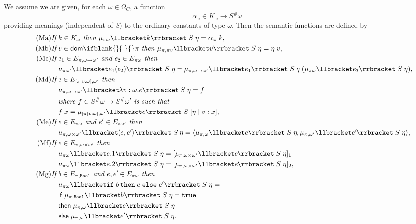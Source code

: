 \documentclass[sigplan,screen,nonacm,balance=false]{acmart}
\theoremstyle{plain}
\DeclarePairedDelimiter{\pair}{\langle}{\rangle}
\DeclarePairedDelimiter{\interp}{\llbracket}{\rrbracket}
\newcommand{\Bool}{\mathtt{Bool}}
\newcommand{\true}{\mathtt{true}}
\newcommand{\ifte}[3]{\mathtt{if} \; #1 \; \mathtt{then} \; #2 \; \mathtt{else} \; #3}
\newcommand{\dom}[1]{\mathsf{dom}\ifblank{#1}{\;}{#1}}
\newcommand{\ifm}{\mathsf{if}}
\newcommand{\thenm}{\mathsf{then}}
\newcommand{\elsem}{\mathsf{else}}
\begin{document}
We assume we are given, for each $\omega \in \Omega_{C}$, a function
%
\begin{equation*}
  \alpha_\omega \in K_\omega \to S^\# \omega
\end{equation*}
%
providing meanings (independent of $S$) to the ordinary constants of type $\omega$.
Then the semantic functions are defined by
%
\begin{align}
  \tag{Ma}
  \textit{If } & k \in K_\omega \textit{ then } \mu_{\pi \omega} \interp{k} \; S \; \eta = \alpha_\omega \; k, \\
  \tag{Mb}
  \textit{If } & v \in \dom{} \pi \textit{ then } \mu_{\pi, \pi v} \interp{v} \; S \; \eta = \eta \; v, \\
  \tag{Mc}
  \textit{If } & e_1 \in E_{\pi, \omega \to \omega'} \textit{ and } e_2 \in E_{\pi \omega} \textit{ then } \\
  \nonumber
  & \mu_{\pi \omega'} \interp{e_1(e_2)} \; S \; \eta = \mu_{\pi, \omega \to \omega'} \interp{e_1} \; S \; \eta \; (\mu_{\pi \omega} \interp{e_2} \; S \; \eta), \\
  \tag{Md}
  \textit{If } & e \in E_{[\pi \mid v : \omega], \omega'} \textit{ then } \\
  \nonumber
  & \mu_{\pi, \omega \to \omega'} \interp{\lambda v : \omega . e} \; S \; \eta = f \\
  \nonumber
  & \textit{where } f \in S^\# \omega \to S^\# \omega' \textit{ is such that } \\
  \nonumber
  & f \; x = \mu_{[\pi \mid v : \omega], \omega'} \interp{e} \; S \; [\eta \mid v : x], \\
  \tag{Me}
  \textit{If } & e \in E_{\pi \omega} \textit{ and } e' \in E_{\pi \omega'} \textit{ then } \\
  \nonumber
  & \mu_{\pi, \omega \times \omega'} \interp{\pair{e, e'}} \; S \; \eta = \pair{\mu_{\pi, \omega} \interp{e} \; S \; \eta, \mu_{\pi, \omega'} \interp{e'} \; S \; \eta}, \\
  \tag{Mf}
  \textit{If } & e \in E_{\pi, \omega \times \omega'} \textit{ then } \\
  \nonumber
  & \mu_{\pi \omega} \interp{e.1} \; S \; \eta = [\mu_{\pi, \omega \times \omega'} \interp{e} \; S \; \eta]_1 \\
  \nonumber
  & \mu_{\pi \omega} \interp{e.2} \; S \; \eta = [\mu_{\pi, \omega \times \omega'} \interp{e} \; S \; \eta]_2, \\
  \tag{Mg}
  \textit{If } & b \in E_{\pi, \Bool} \textit{ and } e, e' \in E_{\pi \omega} \textit{ then } \\
  \nonumber
  & \mu_{\pi \omega} \interp{\ifte{b}{e}{e'}} \; S \; \eta = \\
  \nonumber
  & \ifm \; \mu_{\pi, \Bool}\interp{b} \; S \; \eta = \true \\
  \nonumber
  & \thenm \; \mu_{\pi, \omega} \interp{e} \; S \; \eta \\
  \nonumber
  & \elsem \; \mu_{\pi, \omega} \interp{e'} \; S \; \eta.
\end{align}
\end{document}

